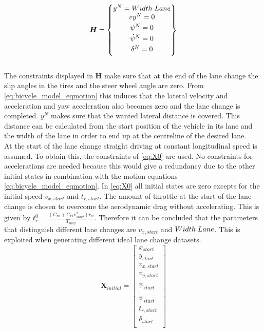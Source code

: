 \begin{equation}\label{eq:H}
\bm{H} =
\begin{Bmatrix}
y^N = Width\hspace{1mm}Lane \\ \vspace{1mm}
vy^N = 0 \\\vspace{1mm}
\psi^N = 0 \\\vspace{1mm}
\dot{\psi}^N = 0 \\\vspace{1mm}
\delta^N = 0 

\end{Bmatrix}
\end{equation}\\

The constraints displayed in $\bm{H}$ make sure that at the end of the lane change the slip angles in the tires and the steer wheel angle are zero. From \ref{eq:bicycle_model_eqmotion} this induces that the lateral velocity and acceleration and yaw acceleration also becomes zero and the lane change is completed. $y^N$ makes sure that the wanted lateral distance is covered. This distance can be calculated from the start position of the vehicle in its lane and the width of the lane in order to end up at the centreline of the desired lane. \\ At the start of the lane change straight driving at constant longitudinal speed is assumed. To obtain this, the constraints of \ref{eq:X0} are used. No constraints for accelerations are needed because this would give a redundancy due to the other initial states in combination with the motion equations \ref{eq:bicycle_model_eqmotion}. In \ref{eq:X0} all initial states are zero excepts for the initial speed $v_{x,start}$ and $t_{r,start}$. The amount of throttle at the start of the lane change is chosen to overcome the aerodynamic drag without accelerating. This is given by $t_r^0 = \frac{(C_{r0}+C_{r1}v_{start}^2)r_w}{T_{max}}$. Therefore it can be concluded that the parameters that distinguish different lane changes are $v_{x,start}$ and $Width\hspace{1mm}Lane$. This is exploited when generating different ideal lane change datasets. 
\begin{equation}\label{eq:X0}
\bm{X}_{initial} =
\begin{bmatrix}
 x_{start}\\ 
 y_{start}\\
 v_{x,start}\\
 v_{y,start}\\
 \psi_{start}\\
 \dot{\psi}_{start}\\
 t_{r,start}\\
 \delta_{start}\\

\end{bmatrix}
\end{equation}\\


